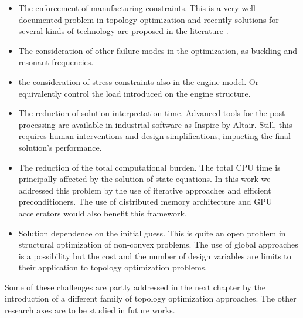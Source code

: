\begin{itemize}
\item The enforcement of manufacturing constraints. This is a very well documented problem in topology optimization and recently solutions for several kinds of technology are proposed in the literature \cite{liu_current_2018}.
\item The consideration of other failure modes in the optimization, as buckling and resonant frequencies.
\item the consideration of stress constraints also in the engine model. Or equivalently control the load introduced on the engine structure.
\item The reduction of solution interpretation time. Advanced tools for the post processing are available in industrial software as Inspire by Altair. Still, this requires human interventions and design simplifications, impacting the final solution's performance.  
\item The reduction of the total computational burden. The total CPU time is principally affected by the solution of state equations. In this work we addressed this problem by the use of iterative approaches and efficient preconditioners. The use of distributed memory architecture \cite{aage2017giga} and GPU accelerators \cite{wadbro2009megapixel} would also benefit this framework.
\item Solution dependence on the initial guess. This is quite an open problem in structural optimization of non-convex problems. The use of global approaches \cite{simon2013evolutionary} is a possibility but the cost and the number of design variables are limits to their application to topology optimization problems.
\end{itemize}
Some of these challenges are partly addressed in the next chapter by the introduction of a different family of topology optimization approaches. The other research axes are to be studied in future works. 

